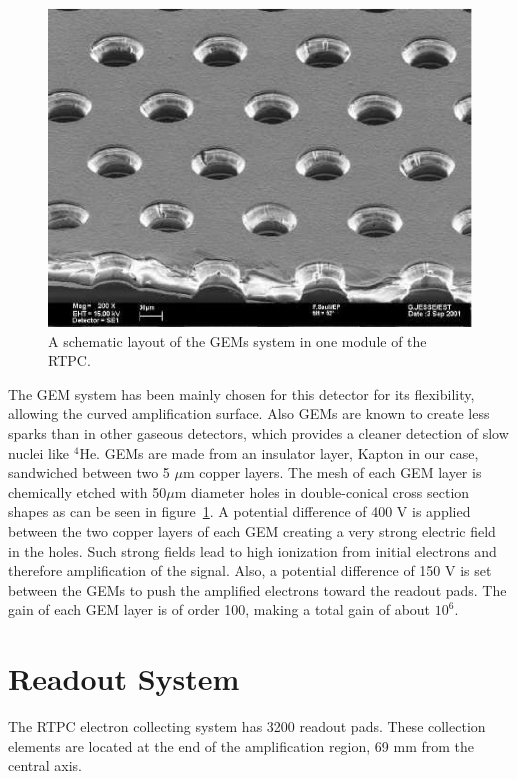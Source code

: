 \documentclass[twocolumn,showpacs,superscriptaddress,groupedaddress]{revtex4}
\begin{document}
\begin{figure}[tbp]
\centering
\includegraphics[scale=0.70]{fig/GEM_photo.jpg}
\caption{A schematic layout of the GEMs system in one module of the RTPC.} 
\label{fig:GEMs}
\end{figure}

The GEM system has been mainly chosen for this detector for its flexibility, 
allowing the curved amplification surface. Also GEMs are known to create less 
sparks than in other gaseous detectors, which provides a cleaner detection of 
slow nuclei like $^4$He. GEMs are made from an insulator layer, Kapton in our 
case, sandwiched between two 5 $\mu$m copper layers. The mesh of each GEM layer 
is chemically etched with 50$\mu$m diameter holes in double-conical cross 
section shapes as can be seen in figure~\ref{fig:GEMs}. A potential difference 
of 400 V is applied between the two copper layers of each GEM creating a very 
strong electric field in the holes. Such strong fields lead to high ionization 
from initial electrons and therefore amplification of the signal. Also, a 
potential difference of 150 V is set between the GEMs to push the amplified 
electrons toward the readout pads. The gain of each GEM layer is of order 100, 
making a total gain of about $10^{6}$.\\

\section{Readout System} \label{sec_readout}
The RTPC electron collecting system has 3200 readout pads. These collection 
elements are located at the end of the amplification region, 69 mm from the 
central axis.
\end{document}
